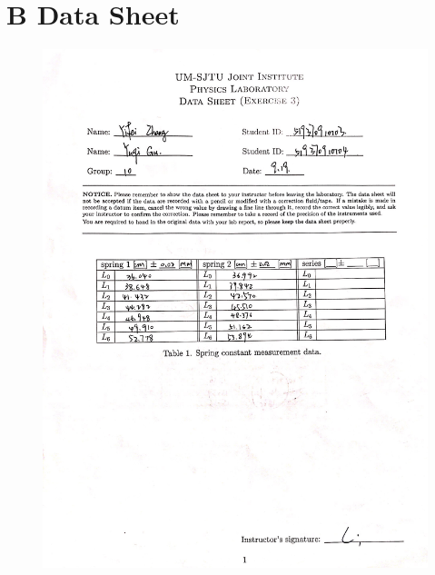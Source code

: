 \documentclass[11pt,a4paper]{article}
\begin{document}
\newpage
\section*{B Data Sheet}
\begin{figure}[H]
    \centering
    \includegraphics[scale=0.3]{data1.jpeg}

\end{figure}
\end{document}
